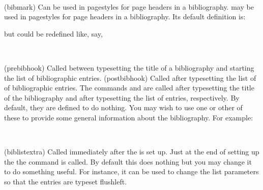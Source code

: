 \begin{syntax}
\cmd{\bibmark} \\
\end{syntax}
\glossary(bibmark)%
  {}%
  {Can be used in pagestyles for page headers in a bibliography.}
 may be used in pagestyles for page headers in a bibliography.
Its default definition is: 
\begin{lcode}
\newcommand*{\bibmark}{}
\end{lcode}
but could be redefined like, say,
\begin{lcode}
\renewcommand*{\bibmark}{\markboth{\bibname}{}}
\end{lcode}


\begin{syntax}
\cmd{\prebibhook} \cmd{\postbibhook} \\
\end{syntax}
\glossary(prebibhook)%
  {}%
  {Called between typesetting the title of a bibliography and starting
   the list of bibliographic entries.}
\glossary(postbibhook)%
  {}%
  {Called after typesetting the list of of bibliographic entries.}
The commands \cmd{\prebibhook} and  are called after 
typesetting the title of the bibliography and after typesetting the list of
entries, respectively. By default, they are defined to do nothing. You may
wish to use one or other of these to provide some general 
information about
the bibliography. For example:
\begin{lcode}
\renewcommand{\prebibhook}{%
CTAN is the Comprehensive \tx\ Archive Network and URLS for the 
several CTAN mirrors can be found at \url{http://www.tug.org}.}
\end{lcode}


\begin{syntax}
\cmd{\biblistextra} \\
\end{syntax}
\glossary(biblistextra)%
  {}%
  {Called immediately after the  is set up.}
Just at the end of setting up the  the \cmd{\biblistextra}
command is called. By default this does nothing but you may change it to
do something useful. For instance, it can be used to change
the list parameters so that the entries are 
typeset flushleft.
\begin{lcode}
\renewcommand*{\biblistextra}{%
  \setlength{\leftmargin}{0pt}%
  \setlength{\itemindent}{\labelwidth}%
  \addtolength{\itemindent}{\labelsep}}
\end{lcode}

